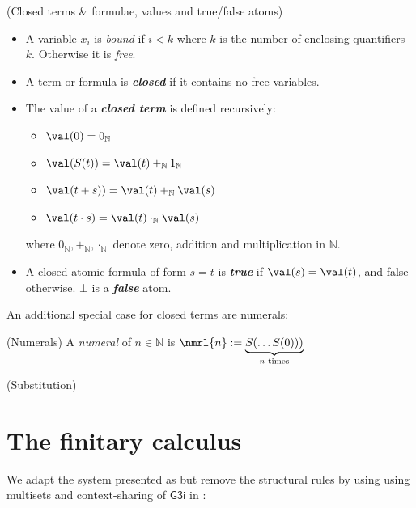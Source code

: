 \begin{cthdefinition}{(Closed terms \& formulae, values and true/false atoms)}
    \begin{itemize}[noitemsep]
        \item A variable $x_i$ is \emph{bound} if $i < k$ where $k$ is the number of enclosing quantifiers $k$. Otherwise it is \emph{free}.
        \item A term or formula is \textbf{\emph{closed}} if it contains no free variables.
        \item The value of a \textbf{\emph{closed term}} is defined recursively:
        \begin{itemize}
            \item $\val(0) = 0_\mathbb{N}$
            \item $\val(S(t)) = \val(t) +_\mathbb{N} 1_\mathbb{N}$
            \item $\val(t + s)) = \val(t) +_\mathbb{N} \val(s)$
            \item $\val(t \cdot s) = \val(t) \cdot_\mathbb{N} \val(s)$
        \end{itemize}
        where $0_\mathbb{N},+_\mathbb{N},\cdot_\mathbb{N}$ denote zero, addition and multiplication in $\mathbb{N}$.
        \item A closed atomic formula of form $s = t$ is \textbf{\emph{true}} if $\val(s)=\val(t)$, and false otherwise. $\bot$ is a \textbf{\emph{false}} atom.
    \end{itemize}
\end{cthdefinition}
An additional special case for closed terms are numerals:
\begin{cthdefinition}{(Numerals)}
A \emph{numeral} of $n \in \mathbb{N}$ is $\nmrl{n} := \underbrace{S(\dots S(0)))}_{\text{$n$-times}}$
\end{cthdefinition}
\begin{cthdefinition}{(Substitution)}
        
\end{cthdefinition}


\section{The finitary calculus}
We adapt the system presented as \cite{SID15} but remove the structural rules by using using multisets and context-sharing of $\textsf{G3i}$ in \cite{TRO00}:


